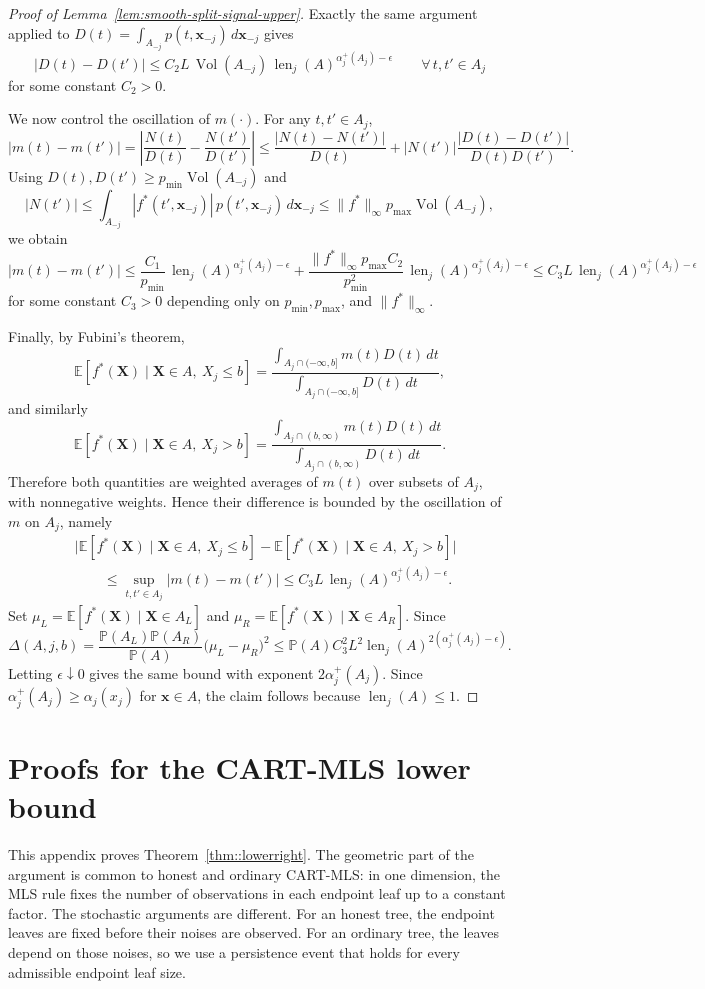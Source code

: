 \documentclass[11pt]{article}
\theoremstyle{plain}
\theoremstyle{definition}
\theoremstyle{remark}
\theoremstyle{plain}
\newcommand{\bx}{\mathbf{x}}
\newcommand{\bX}{\mathbf{X}}
\renewcommand{\P}{\mathbb{P}}
\newcommand{\E}{\mathbb{E}}
\DeclareMathOperator{\Vol}{Vol}
\DeclareMathOperator{\len}{len}
\newcommand{\1}{\mathbbm{1}}
\begin{document}
\begin{proof}[Proof of Lemma~\ref{lem:smooth-split-signal-upper}]
Exactly the same argument applied to $D(t)=\int_{A_{-j}}p(t,\bx_{-j})\,d\bx_{-j}$ gives
\[
|D(t)-D(t')|
\le
C_2L\,\Vol(A_{-j})\,\len_j(A)^{\alpha_j^+(A_j)-\epsilon}
\qquad \forall\, t,t'\in A_j
\]
for some constant $C_2>0$.

We now control the oscillation of $m(\cdot)$. For any $t,t'\in A_j$,
\[
|m(t)-m(t')|
=
\left|\frac{N(t)}{D(t)}-\frac{N(t')}{D(t')}\right|
\le
\frac{|N(t)-N(t')|}{D(t)}
+
|N(t')|\frac{|D(t)-D(t')|}{D(t)D(t')}.
\]
Using $D(t),D(t')\ge p_{\min}\Vol(A_{-j})$ and
\[
|N(t')|
\le
\int_{A_{-j}} |f^*(t',\bx_{-j})|\,p(t',\bx_{-j})\,d\bx_{-j}
\le
\|f^*\|_\infty p_{\max}\Vol(A_{-j}),
\]
we obtain
\[
|m(t)-m(t')|
\le
\frac{C_1}{p_{\min}}\,\len_j(A)^{\alpha_j^+(A_j)-\epsilon}
+
\frac{\|f^*\|_\infty p_{\max} C_2}{p_{\min}^2}\,
\len_j(A)^{\alpha_j^+(A_j)-\epsilon}
\le
C_3L\,\len_j(A)^{\alpha_j^+(A_j)-\epsilon}
\]
for some constant $C_3>0$ depending only on $p_{\min},p_{\max}$, and $\|f^*\|_\infty$.

Finally, by Fubini's theorem,
\[
\E[f^*(\bX)\mid \bX\in A,\ X_j\le b]
=
\frac{\int_{A_j\cap(-\infty,b]} m(t)D(t)\,dt}
{\int_{A_j\cap(-\infty,b]} D(t)\,dt},
\]
and similarly
\[
\E[f^*(\bX)\mid \bX\in A,\ X_j>b]
=
\frac{\int_{A_j\cap(b,\infty)} m(t)D(t)\,dt}
{\int_{A_j\cap(b,\infty)} D(t)\,dt}.
\]
Therefore both quantities are weighted averages of $m(t)$ over subsets of $A_j$, with nonnegative weights. Hence their difference is bounded by the oscillation of $m$ on $A_j$, namely
\begin{align*}
&\big|
\E[f^*(\bX)\mid \bX\in A,\ X_j\le b]
-
\E[f^*(\bX)\mid \bX\in A,\ X_j>b]
\big| \\
&\qquad\le
\sup_{t,t'\in A_j}|m(t)-m(t')|
\le
C_3L\,\len_j(A)^{\alpha_j^+(A_j)-\epsilon}.
\end{align*}
Set $\mu_L=\E[f^*(\bX)\mid\bX\in A_L]$ and
$\mu_R=\E[f^*(\bX)\mid\bX\in A_R]$. Since
\[
\Delta(A,j,b)
=
\frac{\P(A_L)\P(A_R)}{\P(A)}
\bigl(\mu_L-\mu_R\bigr)^2
\le
\P(A)C_3^2L^2\len_j(A)^{2(\alpha_j^+(A_j)-\epsilon)}.
\]
Letting $\epsilon\downarrow0$ gives the same bound with exponent
$2\alpha_j^+(A_j)$. Since
$\alpha_j^+(A_j)\ge\alpha_j(x_j)$ for $\bx\in A$, the claim follows
because $\len_j(A)\le1$.
\end{proof}

\section{Proofs for the CART-MLS lower bound}
\label{app:cart-mls-lower-bound}

This appendix proves Theorem~\ref{thm::lowerright}. The geometric part of
the argument is common to honest and ordinary CART-MLS: in one dimension,
the MLS rule fixes the number of observations in each endpoint leaf up to
a constant factor. The stochastic arguments are different. For an honest
tree, the endpoint leaves are fixed before their noises are observed. For an
ordinary tree, the leaves depend on those noises, so we use a persistence
event that holds for every admissible endpoint leaf size.
\end{document}

